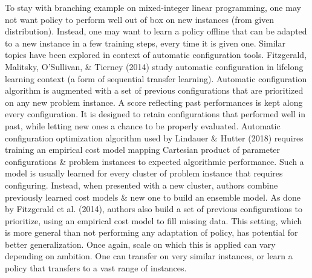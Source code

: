 \documentclass{article}
\begin{document}
\begin{itemize}
\begin{itemize}
        To stay with branching example on mixed-integer linear programming, one may not want policy to perform well out of box on new instances (from given distribution). Instead, one may want to learn a policy offline that can be adapted to a new instance in a few training steps, every time it is given one. Similar topics have been explored in context of automatic configuration tools. Fitzgerald, Malitsky, O'Sullivan, \& Tierney (2014) study automatic configuration in lifelong learning context (a form of sequential transfer learning). Automatic configuration algorithm is augmented with a set of previous configurations that are prioritized on any new problem instance. A score reflecting past performances is kept along every configuration. It is designed to retain configurations that performed well in past, while letting new ones a chance to be properly evaluated. Automatic configuration optimization algorithm used by Lindauer \& Hutter (2018) requires training an empirical cost model mapping Cartesian product of parameter configurations \& problem instances to expected algorithmic performance. Such a model is usually learned for every cluster of problem instance that requires configuring. Instead, when presented with a new cluster, authors combine previously learned cost models \& new one to build an ensemble model. As done by Fitzgerald et al. (2014), authors also build a set of previous configurations to prioritize, using an empirical cost model to fill missing data. This setting, which is more general than not performing any adaptation of policy, has potential for better generalization. Once again, scale on which this is applied can vary depending on ambition. One can transfer on very similar instances, or learn a policy that transfers to a vast range of instances.


\end{itemize}
\end{itemize}
\end{document}
